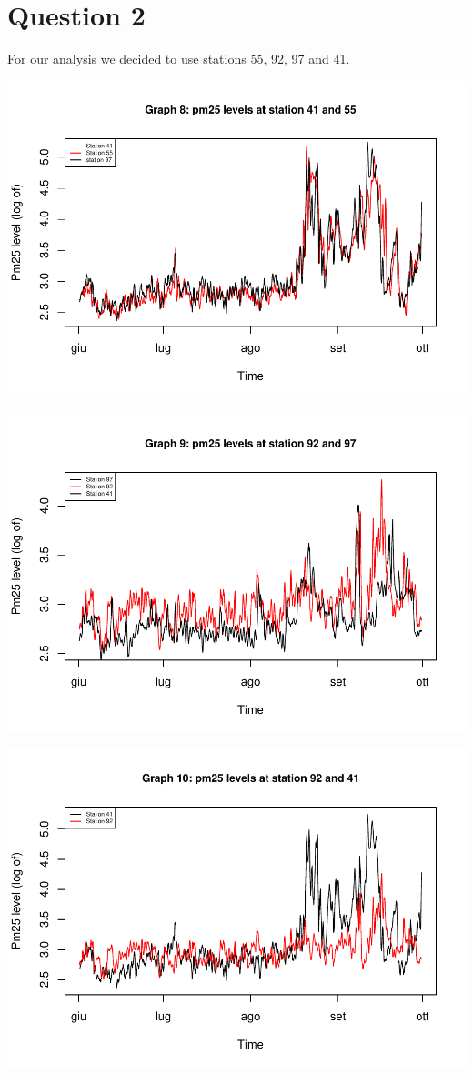 \documentclass[
]{article}
\begin{document}
\hypertarget{question-2}{%
\section{Question 2}\label{question-2}}

For our analysis we decided to use stations 55, 92, 97 and 41.

\begin{center}\includegraphics[width=0.75\linewidth,height=0.75\textheight]{finalproject_files/figure-latex/Graph 8-1} \end{center}

\begin{center}\includegraphics[width=0.75\linewidth,height=0.75\textheight]{finalproject_files/figure-latex/Graph 9-1} \end{center}

\begin{center}\includegraphics[width=0.75\linewidth,height=0.75\textheight]{finalproject_files/figure-latex/Graph 10-1} \end{center}
\end{document}
